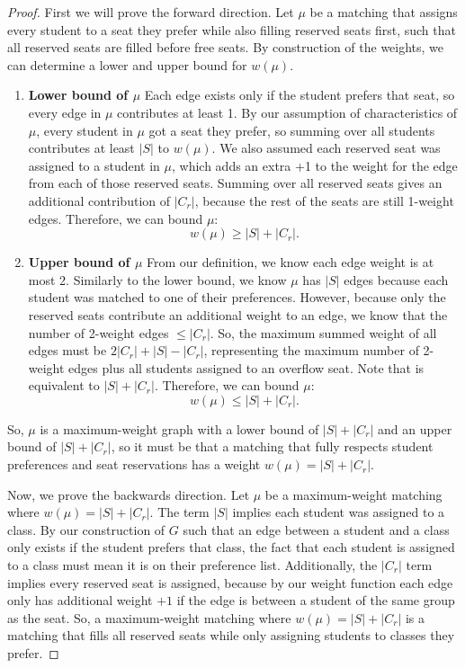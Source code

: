 \begin{proof}
  First we will prove the forward direction. Let $\mu$ be a matching that
  assigns every student to a seat they
  prefer while also filling reserved seats first, such that all reserved seats
  are filled before free seats. By construction of the weights, we can
  determine a lower and upper bound for $w(\mu)$.

  \begin{enumerate}
    \item
          \textbf{Lower bound of $\mu$ }  Each edge exists only
          if the student prefers that seat, so every edge in $\mu$ contributes at
          least 1. By our assumption of characteristics of $\mu$, every student in
          $\mu$ got a seat they prefer, so summing over all students contributes at
          least $|S|$ to $w(\mu)$. We also assumed each reserved seat was assigned to
          a student in $\mu$, which adds an extra +1 to the weight for the edge from
          each of those reserved seats. Summing over all reserved seats gives an
          additional contribution of $|C_r|$, because the rest of the seats are still
          1-weight edges. Therefore, we can bound $\mu$: \[ w(\mu) \geq |S| + |C_r|.
          \]

    \item
          \textbf{Upper bound of $\mu$} From our definition, we know each edge
          weight is at most 2. Similarly to the lower bound, we know $\mu$ has $|S|$
          edges because each student was matched to one of their preferences.
          However, because only the reserved seats contribute an additional weight
          to an edge, we know that the number of 2-weight edges $\leq |C_r|$. So,
          the maximum summed weight of all edges must be $2|C_r| + |S| - |C_r|$,
          representing the maximum number of 2-weight edges plus all students
          assigned to an overflow seat. Note that is equivalent to $|S| + |C_r|$.
          Therefore, we can bound $\mu$: \[ w(\mu) \leq |S| + |C_r|. \]
  \end{enumerate}

  So, $\mu$ is a maximum-weight graph with a lower bound of $|S| + |C_r|$ and an
  upper bound of $|S| + |C_r|$, so it must be that a matching that fully respects
  student preferences and seat reservations has a weight $w(\mu) = |S| + |C_r|$.

  Now, we prove the backwards direction. Let $\mu$ be a maximum-weight matching
  where $w(\mu) = |S| + |C_r|$. The term $|S|$ implies each student was assigned
  to a class. By our construction of $G$ such that an edge between a student and a
  class only exists if the student prefers that class, the fact that each student
  is assigned to a class must mean it is on their preference list. Additionally,
  the $|C_r|$ term implies every reserved seat is assigned, because by our weight
  function each edge only has additional weight $+1$ if the edge is between a
  student of the same group as the seat. So, a maximum-weight matching where
  $w(\mu) = |S| + |C_r|$ is a matching that fills all reserved seats while only
  assigning students to classes they prefer.
\end{proof}

